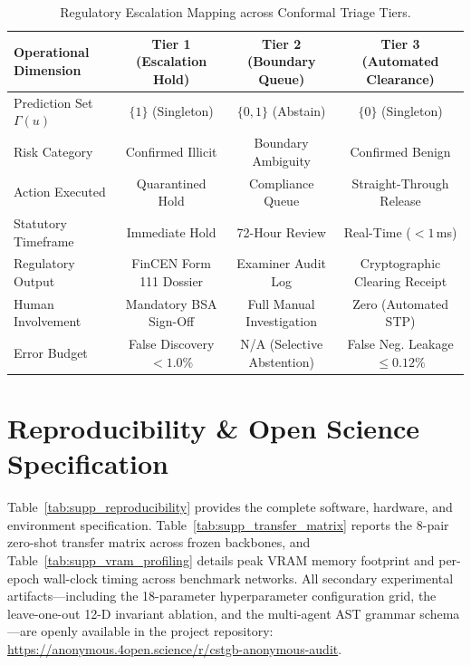 \documentclass[a4paper,fleqn,twocolumn]{article}
\renewcommand{\arraystretch}{0.88}
\begin{document}
\begin{table}[t]
\centering
\caption{Regulatory Escalation Mapping across Conformal Triage Tiers.}
\label{tab:supp_governance_sop}
\renewcommand{\arraystretch}{0.90}
\setlength{\tabcolsep}{6pt}
\begin{tabular}{lccc}
\toprule
\textbf{Operational Dimension} & \textbf{Tier 1 (Escalation Hold)} & \textbf{Tier 2 (Boundary Queue)} & \textbf{Tier 3 (Automated Clearance)} \\
\midrule
Prediction Set $\Gamma(u)$ & $\{1\}$ (Singleton) & $\{0, 1\}$ (Abstain) & $\{0\}$ (Singleton) \\
Risk Category & Confirmed Illicit & Boundary Ambiguity & Confirmed Benign \\
Action Executed & Quarantined Hold & Compliance Queue & Straight-Through Release \\
Statutory Timeframe & Immediate Hold & 72-Hour Review & Real-Time ($< 1$\,ms) \\
Regulatory Output & FinCEN Form 111 Dossier & Examiner Audit Log & Cryptographic Clearing Receipt \\
Human Involvement & Mandatory BSA Sign-Off & Full Manual Investigation & Zero (Automated STP) \\
Error Budget & False Discovery $< 1.0\%$ & N/A (Selective Abstention) & False Neg. Leakage $\le 0.12\%$ \\
\bottomrule
\end{tabular}
\end{table}

\section{Reproducibility \& Open Science Specification}
\label{sec:reproducibility_checklist}

Table~\ref{tab:supp_reproducibility} provides the complete software, hardware, and environment specification. Table~\ref{tab:supp_transfer_matrix} reports the 8-pair zero-shot transfer matrix across frozen backbones, and Table~\ref{tab:supp_vram_profiling} details peak VRAM memory footprint and per-epoch wall-clock timing across benchmark networks. All secondary experimental artifacts---including the 18-parameter hyperparameter configuration grid, the leave-one-out 12-D invariant ablation, and the multi-agent AST grammar schema---are openly available in the project repository: \url{https://anonymous.4open.science/r/cstgb-anonymous-audit}.
\end{document}
